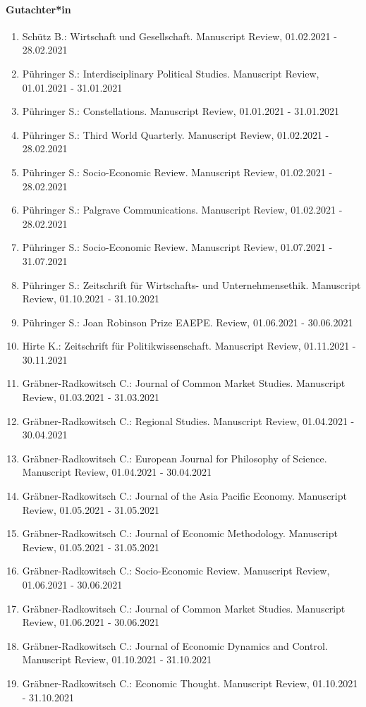 \paragraph{Gutachter*in}
\begin{enumerate}[leftmargin=*, labelsep=0.5cm]
\item Schütz B.: Wirtschaft und Gesellschaft. Manuscript Review, 01.02.2021 - 28.02.2021
\item Pühringer S.: Interdisciplinary Political Studies. Manuscript Review, 01.01.2021 - 31.01.2021
\item Pühringer S.: Constellations. Manuscript Review, 01.01.2021 - 31.01.2021
\item Pühringer S.: Third World Quarterly. Manuscript Review, 01.02.2021 - 28.02.2021
\item Pühringer S.: Socio-Economic Review. Manuscript Review, 01.02.2021 - 28.02.2021
\item Pühringer S.: Palgrave Communications. Manuscript Review, 01.02.2021 - 28.02.2021
\item Pühringer S.: Socio-Economic Review. Manuscript Review, 01.07.2021 - 31.07.2021
\item Pühringer S.: Zeitschrift für Wirtschafts- und Unternehmensethik. Manuscript Review, 01.10.2021 - 31.10.2021
\item Pühringer S.: Joan Robinson Prize EAEPE. Review, 01.06.2021 - 30.06.2021
\item Hirte K.: Zeitschrift für Politikwissenschaft. Manuscript Review, 01.11.2021 - 30.11.2021
\item Gräbner-Radkowitsch C.: Journal of Common Market Studies. Manuscript Review, 01.03.2021 - 31.03.2021
\item Gräbner-Radkowitsch C.: Regional Studies. Manuscript Review, 01.04.2021 - 30.04.2021
\item Gräbner-Radkowitsch C.: European Journal for Philosophy of Science. Manuscript Review, 01.04.2021 - 30.04.2021
\item Gräbner-Radkowitsch C.: Journal of the Asia Pacific Economy. Manuscript Review, 01.05.2021 - 31.05.2021
\item Gräbner-Radkowitsch C.: Journal of Economic Methodology. Manuscript Review, 01.05.2021 - 31.05.2021
\item Gräbner-Radkowitsch C.: Socio-Economic Review. Manuscript Review, 01.06.2021 - 30.06.2021
\item Gräbner-Radkowitsch C.: Journal of Common Market Studies. Manuscript Review, 01.06.2021 - 30.06.2021
\item Gräbner-Radkowitsch C.: Journal of Economic Dynamics and Control. Manuscript Review, 01.10.2021 - 31.10.2021
\item Gräbner-Radkowitsch C.: Economic Thought. Manuscript Review, 01.10.2021 - 31.10.2021
\end{enumerate}

